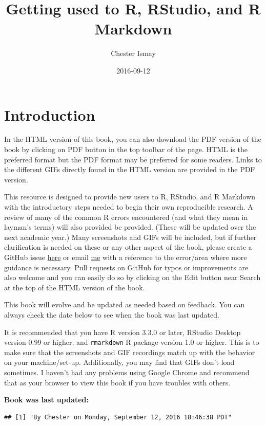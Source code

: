 \documentclass[]{tufte-book}
\title{Getting used to R, RStudio, and R Markdown}
\author{Chester Ismay}
\date{2016-09-12}
\begin{document}
\maketitle



{
\setcounter{tocdepth}{1}
\tableofcontents
}

\chapter{Introduction}\label{intro}

In the HTML version of this book, you can also download the PDF version
of the book by clicking on PDF button in the top toolbar of the page.
HTML is the preferred format but the PDF format may be preferred for
some readers. Links to the different GIFs directly found in the HTML
version are provided in the PDF version.

This resource is designed to provide new users to R, RStudio, and R
Markdown with the introductory steps needed to begin their own
reproducible research. A review of many of the common R errors
encountered (and what they mean in layman's terms) will also provided be
provided. (These will be updated over the next academic year.) Many
screenshots and GIFs will be included, but if further clarification is
needed on these or any other aspect of the book, please create a GitHub
issue \href{https://github.com/ismayc/rbasics-book/issues}{here} or
email \href{mailto:chester.ismay@gmail.com}{me} with a reference to the
error/area where more guidance is necessary. Pull requests on GitHub for
typos or improvements are also welcome and you can easily do so by
clicking on the Edit button near Search at the top of the HTML version
of the book.

This book will evolve and be updated as needed based on feedback. You
can always check the date below to see when the book was last updated.

It is recommended that you have R version 3.3.0 or later, RStudio
Desktop version 0.99 or higher, and \texttt{rmarkdown} R package version
1.0 or higher. This is to make sure that the screenshots and GIF
recordings match up with the behavior on your machine/set-up.
Additionally, you may find that GIFs don't load sometimes. I haven't had
any problems using Google Chrome and recommend that as your browser to
view this book if you have troubles with others.

\textbf{Book was last updated:}

\begin{verbatim}
## [1] "By Chester on Monday, September 12, 2016 18:46:38 PDT"
\end{verbatim}
\end{document}
